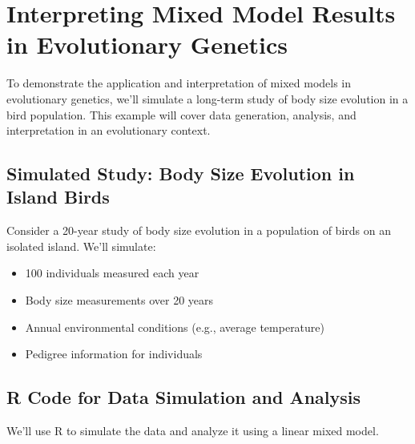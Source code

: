 \documentclass[12pt,a4paper]{article}
\begin{document}
\section{Interpreting Mixed Model Results in Evolutionary Genetics}

To demonstrate the application and interpretation of mixed models in evolutionary genetics, we'll simulate a long-term study of body size evolution in a bird population. This example will cover data generation, analysis, and interpretation in an evolutionary context.

\subsection{Simulated Study: Body Size Evolution in Island Birds}

Consider a 20-year study of body size evolution in a population of birds on an isolated island. We'll simulate:

\begin{itemize}
    \item 100 individuals measured each year
    \item Body size measurements over 20 years
    \item Annual environmental conditions (e.g., average temperature)
    \item Pedigree information for individuals
\end{itemize}

\subsection{R Code for Data Simulation and Analysis}

We'll use R to simulate the data and analyze it using a linear mixed model.
\end{document}
